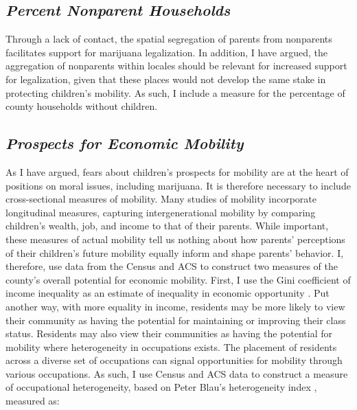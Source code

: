 \subsection{\it{Percent Nonparent Households}}

Through a lack of contact, the spatial segregation of parents from nonparents facilitates support for marijuana legalization. In addition, I have argued, the aggregation of nonparents within locales should be relevant for increased support for legalization, given that these places would not develop the same stake in protecting children's mobility. As such, I include a measure for the percentage of county households without children.



%

\subsection{\it{Prospects for Economic Mobility}}

As I have argued, fears about children's prospects for mobility are at the heart of positions on moral issues, including marijuana. It is therefore necessary to include cross-sectional measures of mobility. Many studies of mobility incorporate longitudinal measures, capturing intergenerational mobility by comparing children's wealth, job, and income to that of their parents. While important, these measures of actual mobility tell us nothing about how parents' perceptions of their children's future mobility equally inform and shape parents' behavior. I, therefore, use data from the Census and ACS to construct two measures of the county's overall potential for economic mobility. First, I use the Gini coefficient of income inequality as an estimate of inequality in economic opportunity \citep{corak_2013,kuznets_1955}. Put another way, with more equality in income, residents may be more likely to view their community as having the potential for maintaining or improving their class status. Residents may also view their communities as having the potential for mobility where heterogeneity in occupations exists. The placement of residents across a diverse set of occupations can signal opportunities for mobility through various occupations. As such, I use Census and ACS data to construct a measure of occupational heterogeneity, based on Peter Blau's heterogeneity index \citep{blau_1977a}, measured as:

